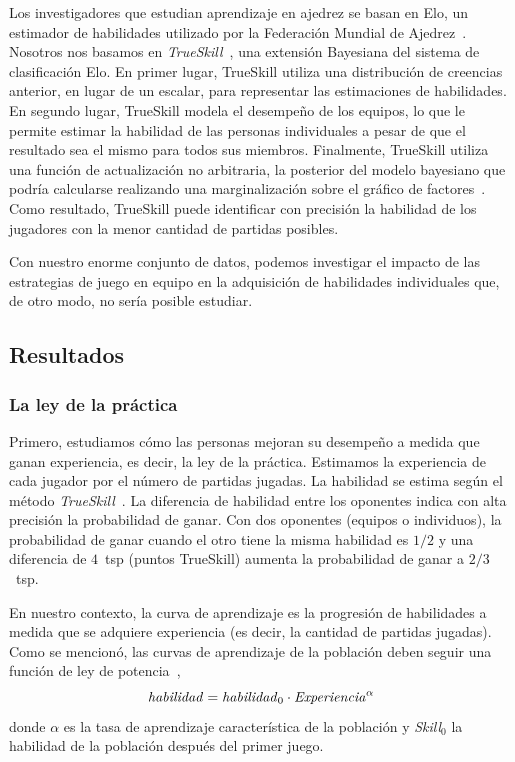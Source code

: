 \documentclass[a4paper,10pt]{book}
\theoremstyle{definition}
\begin{document}
Los investigadores que estudian aprendizaje en ajedrez se basan en Elo, un estimador de habilidades utilizado por la Federaci\'on Mundial de Ajedrez~\cite{glickman1995-guideToChessRatings,glickman2001}.
%
Nosotros nos basamos en \emph{TrueSkill}~\cite{Herbrich2007}, una extensi\'on Bayesiana del sistema de clasificaci\'on Elo.
%
En primer lugar, TrueSkill utiliza una distribuci\'on de creencias anterior, en lugar de un escalar, para representar las estimaciones de habilidades.
%
En segundo lugar, TrueSkill modela el desempeño de los equipos, lo que le permite estimar la habilidad de las personas individuales a pesar de que el resultado sea el mismo para todos sus miembros.
%
Finalmente, TrueSkill utiliza una funci\'on de actualizaci\'on no arbitraria, la posterior del modelo bayesiano que podr\'ia calcularse realizando una marginalizaci\'on sobre el gráfico de factores~\cite{Kschischang2001}.
%
Como resultado, TrueSkill puede identificar con precisi\'on la habilidad de los jugadores con la menor cantidad de partidas posibles.


Con nuestro enorme conjunto de datos, podemos investigar el impacto de las estrategias de juego en equipo en la adquisici\'on de habilidades individuales que, de otro modo, no ser\'ia posible estudiar.

\subsection{Resultados}

\subsubsection{La ley de la práctica}

Primero, estudiamos c\'omo las personas mejoran su desempeño a medida que ganan experiencia, es decir, la ley de la práctica.
%
Estimamos la experiencia de cada jugador por el n\'umero de partidas jugadas.
%
La habilidad se estima seg\'un el método \emph{TrueSkill}~\cite{Herbrich2007}.
%
La diferencia de habilidad entre los oponentes indica con alta precisi\'on la probabilidad de ganar.
%
Con dos oponentes (equipos o individuos), la probabilidad de ganar cuando el otro tiene la misma habilidad es $1/2$ y una diferencia de $4$~tsp (puntos TrueSkill) aumenta la probabilidad de ganar a $2/3$~tsp.


En nuestro contexto, la curva de aprendizaje es la progresi\'on de habilidades a medida que se adquiere experiencia (es decir, la cantidad de partidas jugadas). 
%
Como se mencion\'o, las curvas de aprendizaje de la poblaci\'on deben seguir una funci\'on de ley de potencia~\cite{Newell1981},
%
\begin{equation}\label{lawOfPractice}
   \text{\emph{habilidad}} = \text{\emph{habilidad}}_0 \cdot \text{\emph{Experiencia}}^{\alpha}
\end{equation} 
%
donde $\alpha$ es la tasa de aprendizaje caracter\'istica de la poblaci\'on y \emph{Skill}$_0$ la habilidad de la poblaci\'on después del primer juego.
\end{document}
